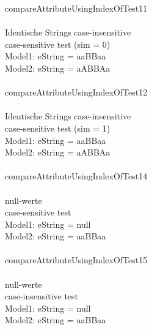 compareAttributeUsingIndexOfTest11\\\\
Identische Strings case-insensitive\\
case-sensitive test (sim = 0)\\
Model1: eString = aaBBaa\\
Model2: eString = aABBAa\\\\

compareAttributeUsingIndexOfTest12\\\\
Identische Strings case-insensitive\\
case-sensitive test (sim = 1)\\
Model1: eString = aaBBaa\\
Model2: eString = aABBAa\\\\

compareAttributeUsingIndexOfTest14\\\\
null-werte\\
case-sensitive test \\
Model1: eString = null\\
Model2: eString = aaBBaa\\\\

compareAttributeUsingIndexOfTest15\\\\
null-werte\\
case-insensitive test \\
Model1: eString = null\\
Model2: eString = aaBBaa\\\\
